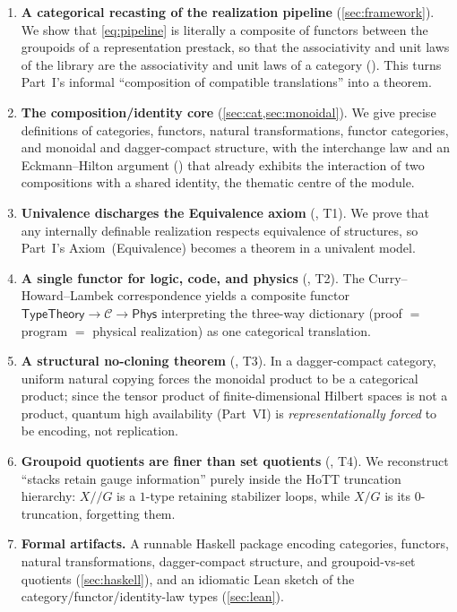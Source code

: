 \documentclass[12pt]{article}
\theoremstyle{definition}
\theoremstyle{remark}
\newcommand{\Phys}{\mathsf{Phys}}
\begin{document}
\begin{enumerate}
\item \textbf{A categorical recasting of the realization pipeline}
(\cref{sec:framework}). We show that \eqref{eq:pipeline} is literally a composite
of functors between the groupoids of a representation prestack, so that the
associativity and unit laws of the library are the associativity and unit laws
of a category (). This turns Part~I's informal
``composition of compatible translations'' into a theorem.

\item \textbf{The composition/identity core}
(\cref{sec:cat,sec:monoidal}). We give precise definitions of categories,
functors, natural transformations, functor categories, and monoidal and
dagger-compact structure, with the interchange law and an Eckmann--Hilton
argument () that already exhibits the interaction of
two compositions with a shared identity, the thematic centre of the module.

\item \textbf{Univalence discharges the Equivalence axiom}
(, T1). We prove that any internally definable realization
respects equivalence of structures, so Part~I's Axiom~(Equivalence) becomes a
theorem in a univalent model.

\item \textbf{A single functor for logic, code, and physics}
(, T2). The Curry--Howard--Lambek correspondence yields a composite
functor $\mathsf{TypeTheory}\to\mathcal{C}\to\Phys$ interpreting the three-way
dictionary (proof $=$ program $=$ physical realization) as one categorical
translation.

\item \textbf{A structural no-cloning theorem} (, T3). In a
dagger-compact category, uniform natural copying forces the monoidal product to
be a categorical product; since the tensor product of finite-dimensional Hilbert
spaces is not a product, quantum high availability (Part~VI) is
\emph{representationally forced} to be encoding, not replication.

\item \textbf{Groupoid quotients are finer than set quotients}
(, T4). We reconstruct ``stacks retain gauge information''
purely inside the HoTT truncation hierarchy: $X/\!/G$ is a $1$-type retaining
stabilizer loops, while $X/G$ is its $0$-truncation, forgetting them.

\item \textbf{Formal artifacts.} A runnable Haskell package encoding categories,
functors, natural transformations, dagger-compact structure, and
groupoid-vs-set quotients (\cref{sec:haskell}), and an idiomatic Lean sketch of
the category/functor/identity-law types (\cref{sec:lean}).
\end{enumerate}
\end{document}

